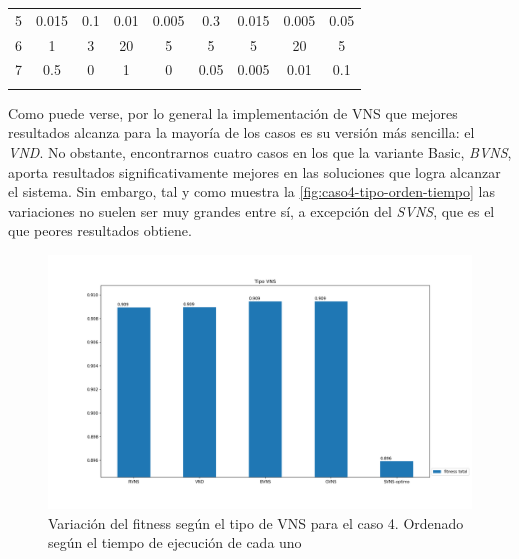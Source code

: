 \begin{table}[h]
{\begin{tabular}{lcccccccc}
			5         &        0.015         &         0.1          &         0.01         &        0.005         &         0.3          &        0.015         &        0.005         &         0.05         \\
			6         &          1           &          3           &          20          &          5           &          5           &          5           &          20          &          5           \\
			7         &         0.5          &          0           &          1           &          0           &         0.05         &        0.005         &         0.01         &         0.1          \\ \hline
			          & \multicolumn{1}{l}{} & \multicolumn{1}{l}{} & \multicolumn{1}{l}{} & \multicolumn{1}{l}{} & \multicolumn{1}{l}{} & \multicolumn{1}{l}{} & \multicolumn{1}{l}{} & \multicolumn{1}{l}{}
		\end{tabular}%
	}
\end{table}

Como puede verse, por lo general la implementación de VNS que mejores resultados alcanza para la mayoría de los casos es su versión más sencilla: el \textit{VND}. No obstante, encontrarnos cuatro casos en los que la variante Basic, \textit{BVNS}, aporta resultados significativamente mejores en las soluciones que logra alcanzar el sistema. Sin embargo, tal y como muestra la \autoref{fig:caso4-tipo-orden-tiempo} las variaciones no suelen ser muy grandes entre sí, a excepción del \textit{SVNS}, que es el que peores resultados obtiene.

\begin{figure}
	\centering
	\includegraphics[width=\linewidth]{capitulos/Capitulo5-Resultados-experimentales/recursos/caso4-tipo-orden-tiempo}
	\caption{Variación del fitness según el tipo de VNS para el caso 4. Ordenado según el tiempo de ejecución de cada uno}
	\label{fig:caso4-tipo-orden-tiempo}
\end{figure}


